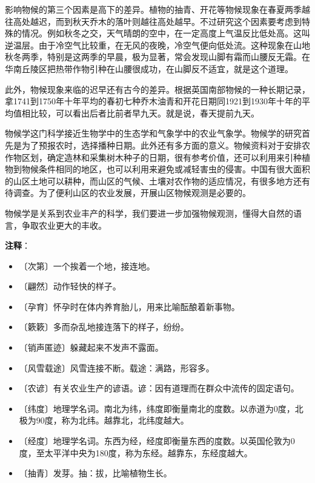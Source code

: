 \documentclass[12pt,UTF-8,openany]{ctexbook}
\begin{document}
\begin{normalsize}
    影响物候的第三个因素是高下的差异。植物的抽青、开花等物候现象在春夏两季越往高处越迟，而到秋天乔木的落叶则越往高处越早。不过研究这个因素要考虑到特殊的情况。例如秋冬之交，天气晴朗的空中，在一定高度上气温反比低处高。这叫逆温层。由于冷空气比较重，在无风的夜晚，冷空气便向低处流。这种现象在山地秋冬两季，特别是这两季的早晨，极为显著，常会发现山脚有霜而山腰反无霜。在华南丘陵区把热带作物引种在山腰很成功，在山脚反不适宜，就是这个道理。
    
    此外，物候现象来临的迟早还有古今的差异。根据英国南部物候的一种长期记录，拿1741到1750年十年平均的春初七种乔木油青和开花日期同1921到1930年十年的平均值相比较，可以看出后者比前者早九天。就是说，春天提前九天。
    
    物候学这门科学接近生物学中的生态学和气象学中的农业气象学。物候学的研究首先是为了预报农时，选择播种日期。此外还有多方面的意义。物候资料对于安排农作物区划，确定造林和采集树木种子的日期，很有参考价值，还可以利用来引种植物到物候条件相同的地区，也可以利用来避免或减轻害虫的侵害。中国有很大面积的山区土地可以耕种，而山区的气候、土壤对农作物的适应情况，有很多地方还有待调查。为了便利山区的农业发展，开展山区物候观测是必要的。
    
    物候学是关系到农业丰产的科学，我们要进一步加强物候观测，懂得大自然的语言，争取农业更大的丰收。
    
\end{normalsize}


\newpage

\textbf{注释}：

\vspace{-1em}

\begin{itemize}
    \setlength\itemsep{-0.2em}
    \item 〔次第〕一个挨着一个地，接连地。
    \item 〔翩然〕动作轻快的样子。
    \item 〔孕育〕怀孕时在体内养育胎儿，用来比喻酝酿着新事物。
    \item 〔簌簌〕多而杂乱地接连落下的样子，纷纷。
    \item 〔销声匿迹〕躲藏起来不发声不露面。
    \item 〔风雪载途〕风雪连接不断。载途：满路，形容多。
    \item 〔农谚〕有关农业生产的谚语。谚：因有道理而在群众中流传的固定语句。
    \item 〔纬度〕地理学名词。南北为纬，纬度即衡量南北的度数。以赤道为0度，北极为90度，称为北纬。越靠北，北纬度越大。
    \item 〔经度〕地理学名词。东西为经，经度即衡量东西的度数。以英国伦敦为0度，至太平洋中央为180度，称为东经。越靠东，东经度越大。
    \item 〔抽青〕发芽。抽：拔，比喻植物生长。
\end{itemize}
\end{document}
